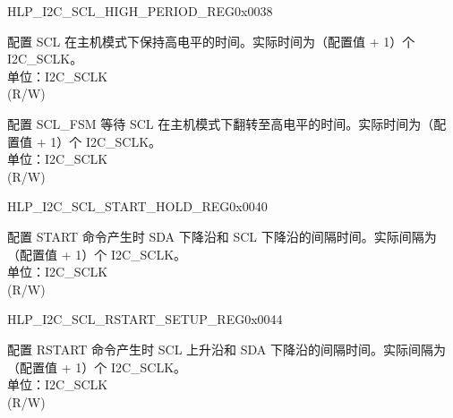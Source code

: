 \begin{register}{H}{LP\_I2C\_SCL\_HIGH\_PERIOD\_REG}{0x0038}\label{regdesc:LPI2CSCLHIGHPERIODREG}
%
%
%
\regnewline%
\begin{regdesc}\begin{reglist}
\label{fielddesc:LPI2CSCLHIGHPERIOD}\item [LP\_I2C\_SCL\_HIGH\_PERIOD] 配置 SCL 在主机模式下保持高电平的时间。实际时间为（配置值 + 1）个 I2C\_SCLK。\\
单位：I2C\_SCLK \\ (R/W)
\label{fielddesc:LPI2CSCLWAITHIGHPERIOD}\item [LP\_I2C\_SCL\_WAIT\_HIGH\_PERIOD] 配置 SCL\_FSM 等待 SCL 在主机模式下翻转至高电平的时间。实际时间为（配置值 + 1）个 I2C\_SCLK。\\
单位：I2C\_SCLK \\ (R/W)
\end{reglist}\end{regdesc}
\end{register}


\begin{register}{H}{LP\_I2C\_SCL\_START\_HOLD\_REG}{0x0040}\label{regdesc:LPI2CSCLSTARTHOLDREG}
%
%
\regnewline%
\begin{regdesc}\begin{reglist}
\label{fielddesc:LPI2CSCLSTARTHOLDTIME}\item [LP\_I2C\_SCL\_START\_HOLD\_TIME] 配置 START 命令产生时 SDA 下降沿和 SCL 下降沿的间隔时间。实际间隔为（配置值 + 1）个 I2C\_SCLK。\\
单位：I2C\_SCLK \\ (R/W)
\end{reglist}\end{regdesc}
\end{register}


\begin{register}{H}{LP\_I2C\_SCL\_RSTART\_SETUP\_REG}{0x0044}\label{regdesc:LPI2CSCLRSTARTSETUPREG}
%
%
\regnewline%
\begin{regdesc}\begin{reglist}
\label{fielddesc:LPI2CSCLRSTARTSETUPTIME}\item [LP\_I2C\_SCL\_RSTART\_SETUP\_TIME] 配置 RSTART 命令产生时 SCL 上升沿和 SDA 下降沿的间隔时间。实际间隔为（配置值 + 1）个 I2C\_SCLK。\\
单位：I2C\_SCLK \\ (R/W)
\end{reglist}\end{regdesc}
\end{register}


